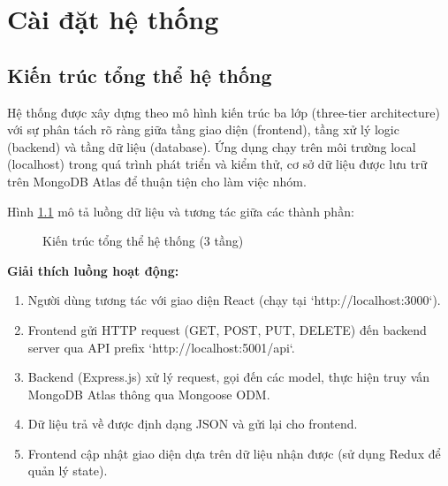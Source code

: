 \chapter{Cài đặt hệ thống}

\section{Kiến trúc tổng thể hệ thống}
Hệ thống được xây dựng theo mô hình kiến trúc ba lớp (three-tier architecture) với sự phân tách rõ ràng giữa tầng giao diện (frontend), tầng xử lý logic (backend) và tầng dữ liệu (database). Ứng dụng chạy trên môi trường local (localhost) trong quá trình phát triển và kiểm thử, cơ sở dữ liệu được lưu trữ trên MongoDB Atlas để thuận tiện cho làm việc nhóm.

Hình \ref{fig:architecture} mô tả luồng dữ liệu và tương tác giữa các thành phần:

\begin{figure}[H]
\centering
{}
\caption{Kiến trúc tổng thể hệ thống (3 tầng)}
\label{fig:architecture}
\end{figure}

\textbf{Giải thích luồng hoạt động:}
\begin{enumerate}
    \item Người dùng tương tác với giao diện React (chạy tại `http://localhost:3000`).
    \item Frontend gửi HTTP request (GET, POST, PUT, DELETE) đến backend server qua API prefix `http://localhost:5001/api`.
    \item Backend (Express.js) xử lý request, gọi đến các model, thực hiện truy vấn MongoDB Atlas thông qua Mongoose ODM.
    \item Dữ liệu trả về được định dạng JSON và gửi lại cho frontend.
    \item Frontend cập nhật giao diện dựa trên dữ liệu nhận được (sử dụng Redux để quản lý state).
\end{enumerate}

